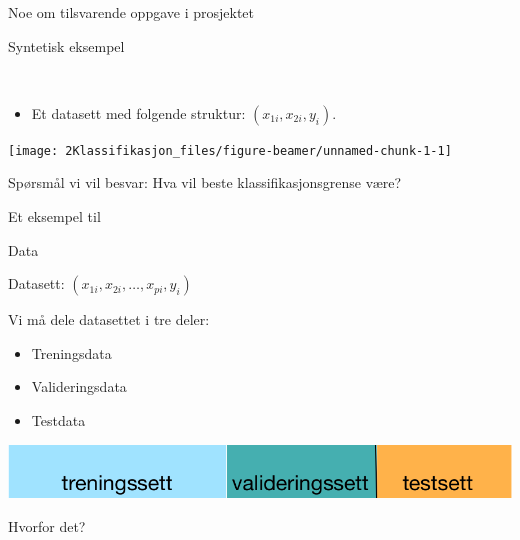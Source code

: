 \documentclass[10pt,ignorenonframetext,]{beamer}
\providecommand{\tightlist}{%
  \setlength{\itemsep}{0pt}\setlength{\parskip}{0pt}}
\begin{document}
\begin{frame}

Noe om tilsvarende oppgave i prosjektet

\end{frame}

\begin{frame}

\begin{block}{Syntetisk eksempel}

\(~\)

\begin{itemize}
\tightlist
\item
  Et datasett med folgende struktur: \((x_{1i},x_{2i},y_i)\).
  \vspace{2mm}
\end{itemize}

\begin{center}\texttt{[image: 2Klassifikasjon\_files/figure-beamer/unnamed-chunk-1-1]} \end{center}

Spørsmål vi vil besvar: Hva vil beste klassifikasjonsgrense være?

\end{block}

\end{frame}

\begin{frame}

\begin{block}{Et eksempel til}

\end{block}

\end{frame}

\begin{frame}{Data}
\protect\hypertarget{data}{}

\vspace{2mm}

Datasett: \((x_{1i},x_{2i},\ldots, x_{pi},y_i)\)

\vspace{2mm}

Vi må dele datasettet i tre deler:

\vspace{2mm}

\begin{itemize}
\tightlist
\item
  Treningsdata
\item
  Valideringsdata
\item
  Testdata
\end{itemize}

\vspace{5mm}

\includegraphics{datasett.png}

\vspace{2mm}

Hvorfor det?

\end{frame}
\end{document}
